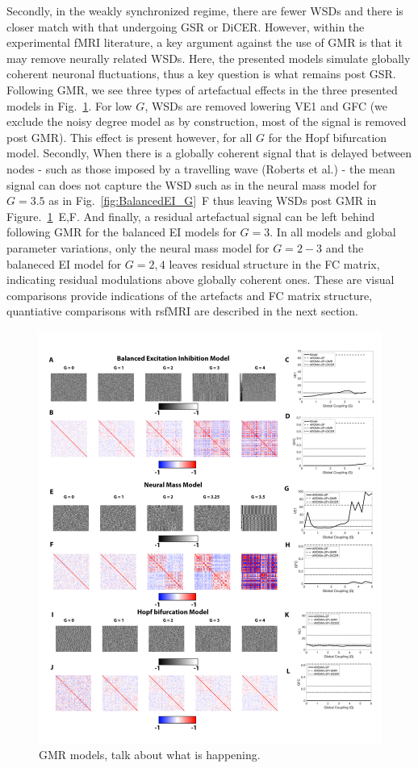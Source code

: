 \documentclass[oneside]{zHenriquesLab-StyleBioRxiv}
\begin{document}
Secondly, in the weakly synchronized regime, there are fewer WSDs and there is closer match with that undergoing GSR or DiCER. However, within the experimental fMRI literature, a key argument against the use of GMR is that it may remove neurally related WSDs. Here, the presented models simulate globally coherent neuronal fluctuations, thus a key question is what remains post GSR. Following GMR, we see three types of artefactual effects in the three presented models in Fig.~\ref{fig:GMRModels}. For low $G$, WSDs are removed lowering VE1 and GFC (we exclude the noisy degree model as by construction, most of the signal is removed post GMR). This effect is present however, for all $G$ for the Hopf bifurcation model. Secondly, When there is a globally coherent signal that is delayed between nodes - such as those imposed by a travelling wave (Roberts et al.) - the mean signal can does not capture the WSD such as in the neural mass model for $G=3.5$ as in Fig.~\ref{fig:BalancedEI_G}~F thus leaving WSDs post GMR in Figure.~\ref{fig:GMRModels}~E,F. And finally, a residual artefactual signal can be left behind following GMR for the balanced EI models for $G=3$. In all models and global parameter variations, only the neural mass model for $G=2-3$ and the balaneced EI model for $G=2,4$ leaves residual structure in the FC matrix, indicating residual modulations above globally coherent ones. These are visual comparisons provide indications of the artefacts and FC matrix structure, quantiative comparisons with rsfMRI are described in the next section. 


\begin{figure}[ht!]
\includegraphics[width=1\textwidth]{figs/GMRModels.png}
\caption{GMR models, talk about what is happening. }\label{fig:GMRModels}
\end{figure}
\end{document}
